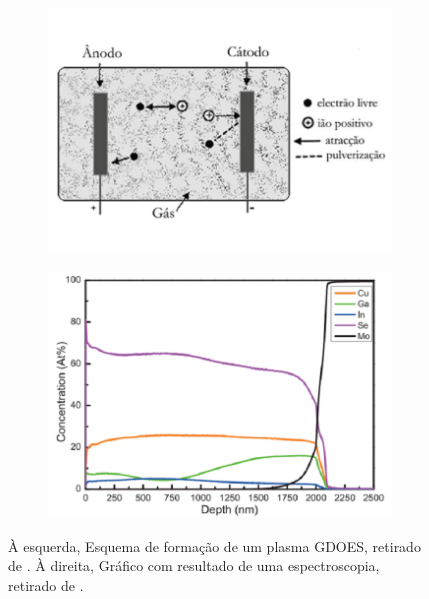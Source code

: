 \begin{figure}[htb]
    \centering
    \begin{subfigure}{.4\textwidth}
      \centering
      \includegraphics[width = 0.9\linewidth]{Figures/Cap2/GDOES_A_C.png}
      \caption{}
      \label{fig_GDOES_A_C}
    \end{subfigure}%
    \begin{subfigure}{.4\textwidth}
      \centering
      \includegraphics[width = 0.9\linewidth]{Figures/Cap2/GDOES_comp.png}
      \caption{}
      \label{fig:GDOES_comp}
    \end{subfigure}
    \caption[Funcionamento e resultados de um GDOES]%
    {À esquerda, Esquema de formação de um plasma GDOES, retirado de \cite{Santos2009}. À direita, Gráfico com resultado de uma espectroscopia, retirado de \cite{Covalent2022}.}
\end{figure}
